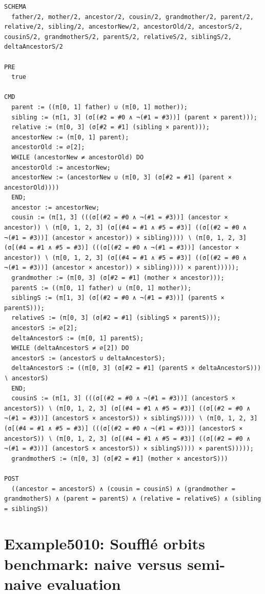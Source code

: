 \documentclass[10pt]{article}
\begin{document}
\begin{Verbatim}[fontsize=\scriptsize,breaklines=true,breakanywhere=true,frame=single,framesep=1.5mm]
SCHEMA
  father/2, mother/2, ancestor/2, cousin/2, grandmother/2, parent/2, relative/2, sibling/2, ancestorNew/2, ancestorOld/2, ancestorS/2, cousinS/2, grandmotherS/2, parentS/2, relativeS/2, siblingS/2, deltaAncestorS/2

PRE
  true 

CMD
  parent := ((π[0, 1] father) ∪ (π[0, 1] mother));
  sibling := (π[1, 3] (σ[(#2 = #0 ∧ ¬(#1 = #3))] (parent × parent)));
  relative := (π[0, 3] (σ[#2 = #1] (sibling × parent)));
  ancestorNew := (π[0, 1] parent);
  ancestorOld := ∅[2];
  WHILE (ancestorNew ≠ ancestorOld) DO
  ancestorOld := ancestorNew;
  ancestorNew := (ancestorNew ∪ (π[0, 3] (σ[#2 = #1] (parent × ancestorOld))))
  END;
  ancestor := ancestorNew;
  cousin := (π[1, 3] (((σ[(#2 = #0 ∧ ¬(#1 = #3))] (ancestor × ancestor)) ∖ (π[0, 1, 2, 3] (σ[(#4 = #1 ∧ #5 = #3)] ((σ[(#2 = #0 ∧ ¬(#1 = #3))] (ancestor × ancestor)) × sibling)))) ∖ (π[0, 1, 2, 3] (σ[(#4 = #1 ∧ #5 = #3)] (((σ[(#2 = #0 ∧ ¬(#1 = #3))] (ancestor × ancestor)) ∖ (π[0, 1, 2, 3] (σ[(#4 = #1 ∧ #5 = #3)] ((σ[(#2 = #0 ∧ ¬(#1 = #3))] (ancestor × ancestor)) × sibling)))) × parent)))));
  grandmother := (π[0, 3] (σ[#2 = #1] (mother × ancestor)));
  parentS := ((π[0, 1] father) ∪ (π[0, 1] mother));
  siblingS := (π[1, 3] (σ[(#2 = #0 ∧ ¬(#1 = #3))] (parentS × parentS)));
  relativeS := (π[0, 3] (σ[#2 = #1] (siblingS × parentS)));
  ancestorS := ∅[2];
  deltaAncestorS := (π[0, 1] parentS);
  WHILE (deltaAncestorS ≠ ∅[2]) DO
  ancestorS := (ancestorS ∪ deltaAncestorS);
  deltaAncestorS := ((π[0, 3] (σ[#2 = #1] (parentS × deltaAncestorS))) ∖ ancestorS)
  END;
  cousinS := (π[1, 3] (((σ[(#2 = #0 ∧ ¬(#1 = #3))] (ancestorS × ancestorS)) ∖ (π[0, 1, 2, 3] (σ[(#4 = #1 ∧ #5 = #3)] ((σ[(#2 = #0 ∧ ¬(#1 = #3))] (ancestorS × ancestorS)) × siblingS)))) ∖ (π[0, 1, 2, 3] (σ[(#4 = #1 ∧ #5 = #3)] (((σ[(#2 = #0 ∧ ¬(#1 = #3))] (ancestorS × ancestorS)) ∖ (π[0, 1, 2, 3] (σ[(#4 = #1 ∧ #5 = #3)] ((σ[(#2 = #0 ∧ ¬(#1 = #3))] (ancestorS × ancestorS)) × siblingS)))) × parentS)))));
  grandmotherS := (π[0, 3] (σ[#2 = #1] (mother × ancestorS)))

POST
  ((ancestor = ancestorS) ∧ (cousin = cousinS) ∧ (grandmother = grandmotherS) ∧ (parent = parentS) ∧ (relative = relativeS) ∧ (sibling = siblingS))
\end{Verbatim}

\Needspace{0.45\textheight}

\section{Example5010: Soufflé orbits benchmark: naive versus semi-naive evaluation}\label{case:Example5010}
\end{document}
